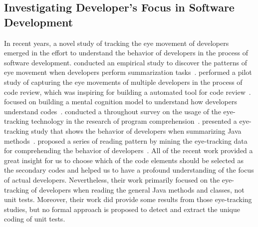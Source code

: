 \subsection{Investigating Developer's Focus in Software Development}

In recent years, a novel study of tracking the eye movement of developers emerged in the effort to understand the behavior of developers in the process of software development.
%
\citeauthor{rodeghero2015empirical} conducted an empirical study to discover the patterns of eye movement when developers perform summarization tasks~\cite{rodeghero2015empirical}.
%
\citeauthor{begel2018eye} performed a pilot study of capturing the eye movements of multiple developers in the process of code review, which was inspiring for building a automated tool for code review~\cite{begel2018eye}.
%
\citeauthor{abid2019using} focused on building a mental cognition model to understand how developers understand codes~\cite{abid2019using}.
%
\citeauthor{obaidellah2018survey} conducted a throughout survey on the usage of the eye-tracking technology in the research of program comprehension~\cite{obaidellah2018survey}.
%
\citeauthor{abid2019developer} presented a eye-tracking study that shows the behavior of developers when summarizing Java methods~\cite{abid2019developer}.
%
\citeauthor{ioannou2020mining} proposed a series of reading pattern by mining the eye-tracking data for comprehending the behavior of developers~\cite{ioannou2020mining}.
%
All of the recent work provided a great insight for us to choose which of the code elements should be selected as the secondary codes and helped us to have a profound understanding of the focus of actual developers.
%
Nevertheless, their work primarily focused on the eye-tracking of developers when reading the general Java methods and classes, not unit tests.
%
Moreover, their work did provide some results from those eye-tracking studies, but no formal approach is proposed to detect and extract the unique coding of unit tests.

